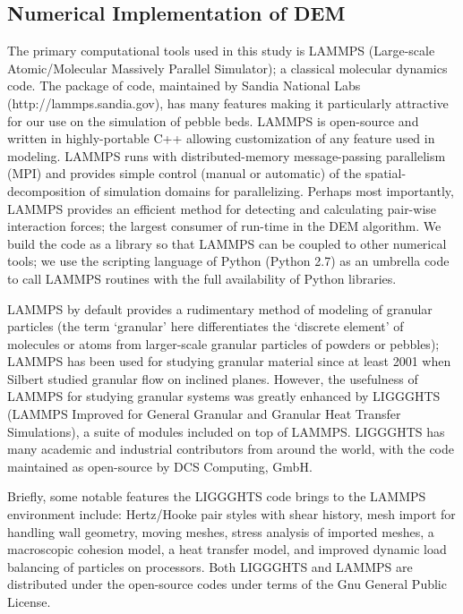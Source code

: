 \subsection{Numerical Implementation of DEM}\label{sec:dem-solver}


The primary computational tools used in this study is LAMMPS (Large-scale Atomic/Molecular Massively Parallel Simulator)\cite{Plimpton1995}; a classical molecular dynamics code. The package of code, maintained by Sandia National Labs (http://lammps.sandia.gov), has many features making it particularly attractive for our use on the simulation of pebble beds. LAMMPS is open-source and written in highly-portable C++ allowing customization of any feature used in modeling. LAMMPS runs with distributed-memory message-passing parallelism (MPI) and provides simple control (manual or automatic) of the spatial-decomposition of simulation domains for parallelizing. Perhaps most importantly, LAMMPS provides an efficient method for detecting and calculating pair-wise interaction forces; the largest consumer of run-time in the DEM algorithm\cite{Plimpton1995}. We build the code as a library so that LAMMPS can be coupled to other numerical tools; we use the scripting language of Python (Python 2.7) as an umbrella code to call LAMMPS routines with the full availability of Python libraries. 

LAMMPS by default provides a rudimentary method of modeling of granular particles (the term `granular' here differentiates the `discrete element' of molecules or atoms from larger-scale granular particles of powders or pebbles); LAMMPS has been used for studying granular material since at least 2001 when Silbert\etal\cite{Silbert2001} studied granular flow on inclined planes. However, the usefulness of LAMMPS for studying granular systems was greatly enhanced by LIGGGHTS (LAMMPS Improved for General Granular and Granular Heat Transfer Simulations), a suite of modules included on top of LAMMPS. LIGGGHTS has many academic and industrial contributors from around the world, with the code maintained as open-source by DCS Computing, GmbH.

Briefly, some notable features the LIGGGHTS code brings to the LAMMPS environment include: Hertz/Hooke pair styles with shear history, mesh import for handling wall geometry, moving meshes, stress analysis of imported meshes, a macroscopic cohesion model, a heat transfer model, and improved dynamic load balancing of particles on processors\cite{Kloss2011,Kloss2012}. Both LIGGGHTS and LAMMPS are distributed under the open-source codes under terms of the Gnu General Public License.



